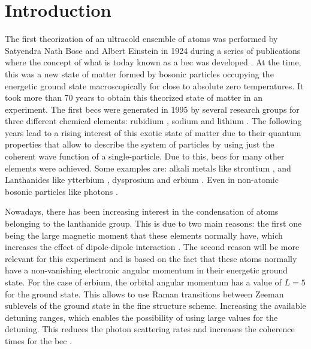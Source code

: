 
\chapter{Introduction}
\label{chap:intro}

The first theorization of an ultracold ensemble of atoms was performed by Satyendra Nath Bose and Albert Einstein in 1924 during a series of publications where the concept of what is today known as a \acf{bec} was developed \cite{Bose1924, Einstein1924, Einstein1925}. At the time, this was a new state of matter formed by bosonic particles occupying the energetic ground state macroscopically for close to absolute zero temperatures. It took more than 70 years to obtain this theorized state of matter in an experiment. The first \acp{bec} were generated in 1995 by several research groups for three different chemical elements: rubidium \cite{Davis1995}, sodium \cite{Anderson1995} and lithium \cite{Bradley1995}. The following years lead to a rising interest of this exotic state of matter due to their quantum properties that allow to describe the system of particles by using just the coherent wave function of a single-particle. Due to this, \acp{bec} for many other elements were achieved. Some examples are: alkali metals like strontium \cite{Stellmer2009}, and Lanthanides like ytterbium \cite{Takasu2003}, dysprosium \cite{Lu2011} and erbium \cite{Aikawa2012}. Even in non-atomic bosonic particles like photons \cite{Klaers2010}.

Nowadays, there has been increasing interest in the condensation of atoms belonging to the lanthanide group. This is due to two main reasons: the first one being the large magnetic moment that these elements normally have, which increases the effect of dipole-dipole interaction \cite{Aikawa2012,Baier2018}. The second reason will be more relevant for this experiment and is based on the fact that these atoms normally have a non-vanishing electronic angular momentum in their energetic ground state. For the case of erbium, the orbital angular momentum has a value of $L=5$ for the ground state. This allows to use Raman transitions between Zeeman sublevels of the ground state in the fine structure scheme. Increasing the available detuning ranges, which enables the possibility of using large values for the detuning. This reduces the photon scattering rates and increases the coherence times for the \ac{bec} \cite{Grimm2000}.

